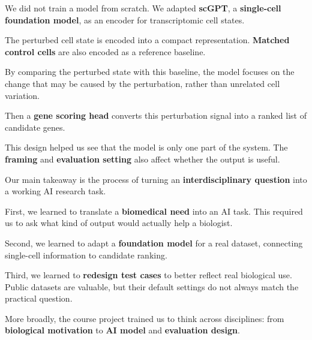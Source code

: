 \documentclass[10pt]{article}
\newcommand{\slidetitle}[1]{\vspace{0.22em}\noindent{\normalsize\textbf{#1}}\par\vspace{-0.04em}}
\begin{document}
\slidetitle{Slide 4}

We did not train a model from scratch. We adapted \textbf{scGPT}, a \textbf{single-cell foundation model}, as an encoder for transcriptomic cell states.

The perturbed cell state is encoded into a compact representation. \textbf{Matched control cells} are also encoded as a reference baseline.

By comparing the perturbed state with this baseline, the model focuses on the change that may be caused by the perturbation, rather than unrelated cell variation.

Then a \textbf{gene scoring head} converts this perturbation signal into a ranked list of candidate genes.

This design helped us see that the model is only one part of the system. The \textbf{framing} and \textbf{evaluation setting} also affect whether the output is useful.

\slidetitle{Slide 5}

Our main takeaway is the process of turning an \textbf{interdisciplinary question} into a working AI research task.

First, we learned to translate a \textbf{biomedical need} into an AI task. This required us to ask what kind of output would actually help a biologist.

Second, we learned to adapt a \textbf{foundation model} for a real dataset, connecting single-cell information to candidate ranking.

Third, we learned to \textbf{redesign test cases} to better reflect real biological use. Public datasets are valuable, but their default settings do not always match the practical question.

More broadly, the course project trained us to think across disciplines: from \textbf{biological motivation} to \textbf{AI model} and \textbf{evaluation design}.
\end{document}
